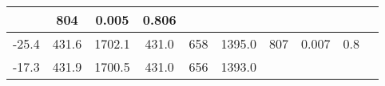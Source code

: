 \documentclass[a4paper,10pt]{article}
\begin{document}
\begin{longtable}{
     |
%    
    c|
%    
    c|
%    
    c|
%    
    c|
%    
    c|
%    
    c|
%    
    c|
%    
    c|
%    
    c|
%    
    c|
%    
    }
%        
        & 804
%        

%        

%        
        & 0.005
%        

%        

%        
        & 0.806
%        

%        
        \\
        \hline

        

%        

%        
        -25.4
%        

%        

%        
        & 431.6
%        

%        

%        
        & 1702.1
%        

%        

%        
        & 431.0
%        

%        

%        
        & 658
%        

%        

%        
        & 1395.0
%        

%        

%        
        & 807
%        

%        

%        
        & 0.007
%        

%        

%        
        & 0.8
%        

%        
        \\
        \hline

        

%        

%        
        -17.3
%        

%        

%        
        & 431.9
%        

%        

%        
        & 1700.5
%        

%        

%        
        & 431.0
%        

%        

%        
        & 656
%        

%        

%        
        & 1393.0
%        

%        


\end{longtable}
\end{document}
